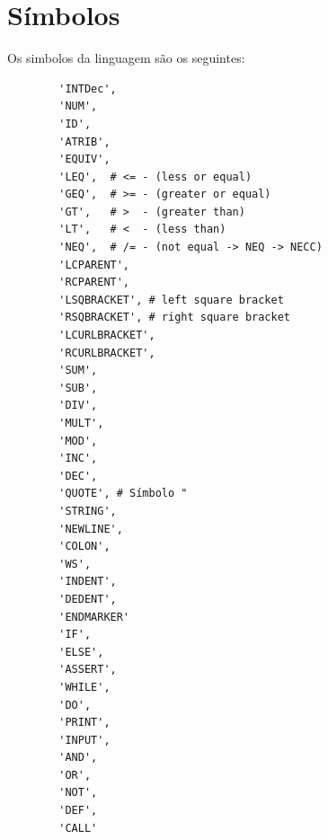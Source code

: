 \documentclass[11pt,a4paper]{report}
\begin{document}
    \section{Símbolos}
    Os simbolos da linguagem são os seguintes:
    \begin{verbatim}
        'INTDec',
        'NUM',
        'ID',
        'ATRIB',
        'EQUIV',
        'LEQ',  # <= - (less or equal)
        'GEQ',  # >= - (greater or equal)
        'GT',   # >  - (greater than)
        'LT',   # <  - (less than)
        'NEQ',  # /= - (not equal -> NEQ -> NECC)
        'LCPARENT',
        'RCPARENT',
        'LSQBRACKET', # left square bracket
        'RSQBRACKET', # right square bracket
        'LCURLBRACKET',
        'RCURLBRACKET',
        'SUM',
        'SUB',
        'DIV',
        'MULT',
        'MOD',
        'INC',
        'DEC',
        'QUOTE', # Símbolo "
        'STRING',
        'NEWLINE',
        'COLON',
        'WS',
        'INDENT',
        'DEDENT',
        'ENDMARKER'
        'IF',
        'ELSE',
        'ASSERT',
        'WHILE',
        'DO',
        'PRINT',
        'INPUT',
        'AND',
        'OR',
        'NOT',
        'DEF',
        'CALL'
    \end{verbatim}
\end{document}
